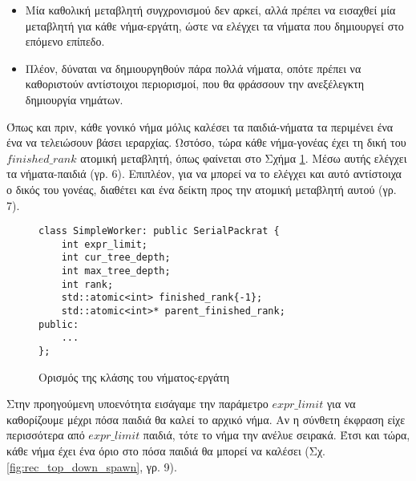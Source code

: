 \begin{itemize}
	\item Μία καθολική μεταβλητή συγχρονισμού δεν αρκεί, αλλά πρέπει να εισαχθεί μία μεταβλητή για κάθε νήμα-εργάτη, ώστε να ελέγχει τα νήματα που δημιουργεί στο επόμενο επίπεδο.
	\item Πλέον, δύναται να δημιουργηθούν πάρα πολλά νήματα, οπότε πρέπει να καθοριστούν αντίστοιχοι περιορισμοί, που θα φράσσουν την ανεξέλεγκτη δημιουργία νημάτων.
\end{itemize}

Όπως και πριν, κάθε γονικό νήμα μόλις καλέσει τα παιδιά-νήματα τα περιμένει ένα ένα να τελειώσουν βάσει ιεραρχίας.
Ωστόσο, τώρα κάθε νήμα-γονέας έχει τη δική του $finished\_rank$ ατομική μεταβλητή, όπως φαίνεται στο Σχήμα \ref{fig:rec_top_down_worker}.
Μέσω αυτής ελέγχει τα νήματα-παιδιά (γρ. 6).
Επιπλέον, για να μπορεί να το ελέγχει και αυτό αντίστοιχα ο δικός του γονέας, διαθέτει και ένα δείκτη προς την ατομική μεταβλητή αυτού (γρ. 7).

\begin{figure}[h]
\setlength\partopsep{-\topsep}%
\begin{verbatim}
class SimpleWorker: public SerialPackrat {
    int expr_limit;
    int cur_tree_depth;
    int max_tree_depth;
    int rank;
    std::atomic<int> finished_rank{-1};
    std::atomic<int>* parent_finished_rank;
public:
    ...
};

\end{verbatim}
\caption{Ορισμός της κλάσης του νήματος-εργάτη}
\label{fig:rec_top_down_worker}
\end{figure}

Στην προηγούμενη υποενότητα εισάγαμε την παράμετρο $expr\_limit$ για να καθορίζουμε μέχρι πόσα παιδιά θα καλεί το αρχικό νήμα.
Αν η σύνθετη έκφραση είχε περισσότερα από $expr\_limit$ παιδιά, τότε το νήμα την ανέλυε σειρακά.
Έτσι και τώρα, κάθε νήμα έχει ένα όριο στο πόσα παιδιά θα μπορεί να καλέσει (Σχ. \ref{fig:rec_top_down_spawn}, γρ. 9).

